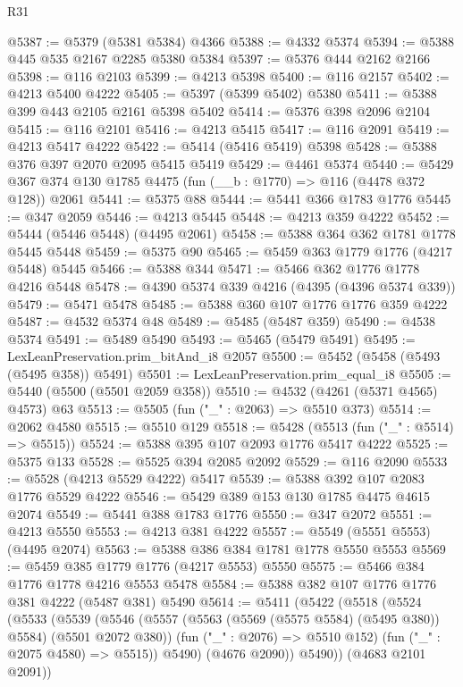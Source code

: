 \begin{lexlean}{R31}
\begin{coremodule}
@5387 := @5379 (@5381 @5384) @4366
@5388 := @4332 @5374
@5394 := @5388 @445 @535 @2167 @2285 @5380 @5384
@5397 := @5376 @444 @2162 @2166
@5398 := @116 @2103
@5399 := @4213 @5398
@5400 := @116 @2157
@5402 := @4213 @5400 @4222
@5405 := @5397 (@5399 @5402) @5380
@5411 := @5388 @399 @443 @2105 @2161 @5398 @5402
@5414 := @5376 @398 @2096 @2104
@5415 := @116 @2101
@5416 := @4213 @5415
@5417 := @116 @2091
@5419 := @4213 @5417 @4222
@5422 := @5414 (@5416 @5419) @5398
@5428 := @5388 @376 @397 @2070 @2095 @5415 @5419
@5429 := @4461 @5374
@5440 := @5429 @367 @374 @130 @1785 @4475 (fun (__b : @1770) => @116 (@4478 @372 @128)) @2061
@5441 := @5375 @88
@5444 := @5441 @366 @1783 @1776
@5445 := @347 @2059
@5446 := @4213 @5445
@5448 := @4213 @359 @4222
@5452 := @5444 (@5446 @5448) (@4495 @2061)
@5458 := @5388 @364 @362 @1781 @1778 @5445 @5448
@5459 := @5375 @90
@5465 := @5459 @363 @1779 @1776 (@4217 @5448) @5445
@5466 := @5388 @344
@5471 := @5466 @362 @1776 @1778 @4216 @5448
@5478 := @4390 @5374 @339 @4216 (@4395 (@4396 @5374 @339))
@5479 := @5471 @5478
@5485 := @5388 @360 @107 @1776 @1776 @359 @4222
@5487 := @4532 @5374 @48
@5489 := @5485 (@5487 @359)
@5490 := @4538 @5374
@5491 := @5489 @5490
@5493 := @5465 (@5479 @5491)
@5495 := LexLeanPreservation.prim_bitAnd_i8 @2057
@5500 := @5452 (@5458 (@5493 (@5495 @358)) @5491)
@5501 := LexLeanPreservation.prim_equal_i8
@5505 := @5440 (@5500 (@5501 @2059 @358))
@5510 := @4532 (@4261 (@5371 @4565) @4573) @63
@5513 := @5505 (fun ("_" : @2063) => @5510 @373)
@5514 := @2062 @4580
@5515 := @5510 @129
@5518 := @5428 (@5513 (fun ("_" : @5514) => @5515))
@5524 := @5388 @395 @107 @2093 @1776 @5417 @4222
@5525 := @5375 @133
@5528 := @5525 @394 @2085 @2092
@5529 := @116 @2090
@5533 := @5528 (@4213 @5529 @4222) @5417
@5539 := @5388 @392 @107 @2083 @1776 @5529 @4222
@5546 := @5429 @389 @153 @130 @1785 @4475 @4615 @2074
@5549 := @5441 @388 @1783 @1776
@5550 := @347 @2072
@5551 := @4213 @5550
@5553 := @4213 @381 @4222
@5557 := @5549 (@5551 @5553) (@4495 @2074)
@5563 := @5388 @386 @384 @1781 @1778 @5550 @5553
@5569 := @5459 @385 @1779 @1776 (@4217 @5553) @5550
@5575 := @5466 @384 @1776 @1778 @4216 @5553 @5478
@5584 := @5388 @382 @107 @1776 @1776 @381 @4222 (@5487 @381) @5490
@5614 := @5411
    (@5422
      (@5518
        (@5524
          (@5533
            (@5539
              (@5546
                (@5557 (@5563 (@5569 (@5575 @5584) (@5495 @380)) @5584) (@5501 @2072 @380))
                (fun ("_" : @2076) => @5510 @152)
                (fun ("_" : @2075 @4580) => @5515))
              @5490)
            (@4676 @2090))
          @5490))
      (@4683 @2101 @2091))

\end{coremodule}
\end{lexlean}
